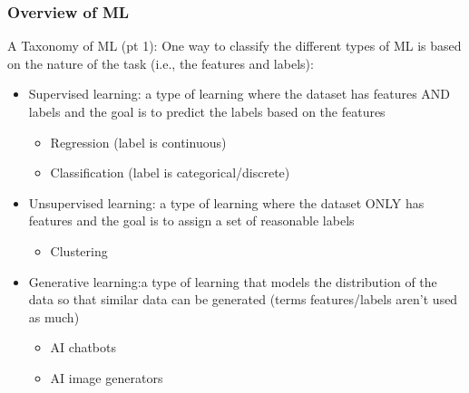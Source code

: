 \documentclass{beamer}
\begin{document}
\begin{frame}	
	\frametitle{Overview of ML}
	
	\begin{block}{A Taxonomy of ML (pt 1):}
		\footnotesize
		One way to classify the different types of ML is based on the nature of the task (i.e., the features and labels):
		\begin{itemize}%
			\item Supervised learning: a type of learning where the dataset has features AND labels and the goal is to predict the labels based on the features 
			\begin{itemize}
				\item Regression (label is continuous)
				\item Classification (label is categorical/discrete)
			\end{itemize}
			\item Unsupervised learning: a type of learning where the dataset ONLY has features and the goal is to assign a set of reasonable labels
			\begin{itemize}
				\item Clustering
			\end{itemize}
			\item Generative learning:a type of learning that models the distribution of the data so that similar data can be generated (terms features/labels aren't used as much)
			\begin{itemize}
				\item AI chatbots
				\item AI image generators
			\end{itemize}
		\end{itemize}
	\end{block}
	
\end{frame}
\end{document}
